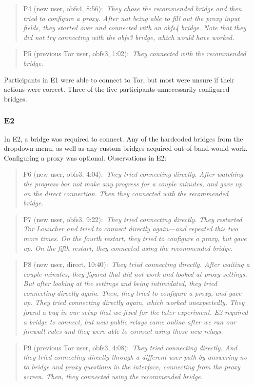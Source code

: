 \documentclass[USenglish,oneside,twocolumn]{article}
\newcommand{\pquote}[2]{
\begin{quotation}
\noindent #1:~\textit{#2}
\end{quotation}
}
\begin{document}
\pquote{P4 (new user, obfs4, 8:56)}{They chose the recommended bridge and then tried to configure a proxy. After not being able to fill out the proxy input fields, they started over and connected with an obfs4 bridge. Note that they did not try connecting with the obfs3 bridge, which would have worked.}

\pquote{P5 (previous Tor user, obfs3, 1:02)}{They connected with the recommended bridge.}

Participants in E1 were able to connect to Tor, but most were unsure if their actions were correct. Three of the five participants unnecessarily configured bridges. 

\subsubsection{E2} 
In E2, a bridge was required to connect. Any of the hardcoded bridges from the dropdown menu, as well as any custom bridges acquired out of band would work. Configuring a proxy was optional.
Observations in E2: 

\pquote{P6 (new user, obfs3, 4:04)}{They tried connecting directly. After watching the progress bar not make any progress for a couple minutes, and gave up on the direct connection. Then they connected with the recommended bridge.}

\pquote{P7 (new user, obfs3, 9:22)}{They tried connecting directly. They restarted Tor Launcher and tried to connect directly again---and repeated this two more times. On the fourth restart, they tried to configure a proxy, but gave up. On the fifth restart, they connected using the recommended bridge.}

\pquote{P8 (new user, direct, 10:40)}{They tried connecting directly. After waiting a couple minutes, they figured that did not work and looked at proxy settings. But after looking at the settings and being intimidated, they tried connecting directly again. Then, they tried to configure a proxy, and gave up. They tried connecting directly again, which worked unexpectedly. They found a bug in our setup that we fixed for the later experiment. E2 required a bridge to connect, but new public relays came online after we ran our firewall rules and they were able to connect using those new relays. }

\pquote{P9 (previous Tor user, obfs3, 4:08)}{They tried connecting directly. And they tried connecting directly through a different user path by answering no to bridge and proxy questions in the interface, connecting from the proxy screen. Then, they connected using the recommended bridge.}
\end{document}
